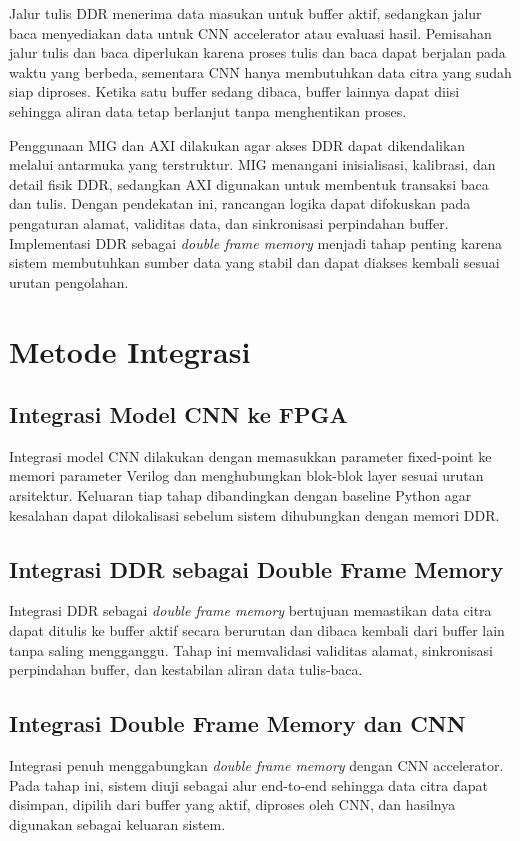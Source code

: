 	Jalur tulis DDR menerima data masukan untuk buffer aktif, sedangkan jalur
	baca menyediakan data untuk CNN accelerator atau evaluasi hasil. Pemisahan
	jalur tulis dan baca diperlukan karena proses tulis dan baca dapat berjalan
	pada waktu yang berbeda, sementara CNN hanya membutuhkan data citra yang
	sudah siap diproses. Ketika satu buffer sedang dibaca, buffer lainnya dapat
	diisi sehingga aliran data tetap berlanjut tanpa menghentikan proses.

	Penggunaan MIG dan AXI dilakukan agar akses DDR dapat dikendalikan melalui
	antarmuka yang terstruktur. MIG menangani inisialisasi, kalibrasi, dan detail
	fisik DDR, sedangkan AXI digunakan untuk membentuk transaksi baca dan tulis.
	Dengan pendekatan ini, rancangan logika dapat difokuskan pada pengaturan
	alamat, validitas data, dan sinkronisasi perpindahan buffer. Implementasi DDR
	sebagai \emph{double frame memory} menjadi tahap penting karena sistem
	membutuhkan sumber data yang stabil dan dapat diakses kembali sesuai urutan
	pengolahan.

\section{Metode Integrasi}
    \subsection{Integrasi Model CNN ke FPGA}
	Integrasi model CNN dilakukan dengan memasukkan parameter fixed-point ke memori parameter Verilog dan menghubungkan blok-blok layer sesuai urutan arsitektur. Keluaran tiap tahap dibandingkan dengan baseline Python agar kesalahan dapat dilokalisasi sebelum sistem dihubungkan dengan memori DDR.
    \subsection{Integrasi DDR sebagai Double Frame Memory}
	Integrasi DDR sebagai \emph{double frame memory} bertujuan memastikan data
	citra dapat ditulis ke buffer aktif secara berurutan dan dibaca kembali dari
	buffer lain tanpa saling mengganggu. Tahap ini memvalidasi validitas alamat,
	sinkronisasi perpindahan buffer, dan kestabilan aliran data tulis-baca.
    \subsection{Integrasi Double Frame Memory dan CNN}
	Integrasi penuh menggabungkan \emph{double frame memory} dengan CNN
	accelerator. Pada tahap ini, sistem diuji sebagai alur end-to-end sehingga
	data citra dapat disimpan, dipilih dari buffer yang aktif, diproses oleh CNN,
	dan hasilnya digunakan sebagai keluaran sistem.

